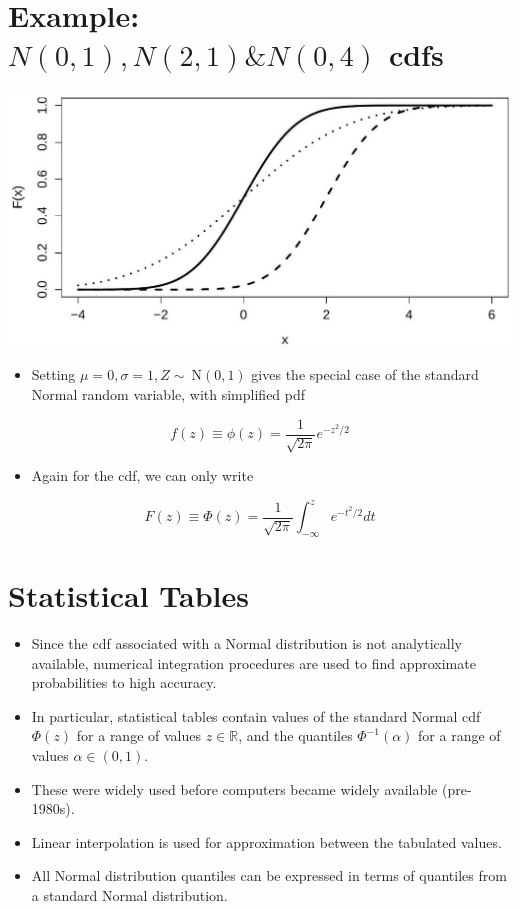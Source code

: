 \documentclass[10pt]{article}
\begin{document}
\section*{Example: $N(0,1), N(2,1) \& N(0,4)$ cdfs}
\begin{center}
\includegraphics[max width=\textwidth]{2025_05_11_1201cfe24e14b364b4ecg-33}
\end{center}

\begin{itemize}
  \item Setting $\mu=0, \sigma=1, Z \sim \mathrm{~N}(0,1)$ gives the special case of the standard Normal random variable, with simplified pdf
\end{itemize}

$$
f(z) \equiv \phi(z)=\frac{1}{\sqrt{2 \pi}} e^{-z^{2} / 2}
$$

\begin{itemize}
  \item Again for the cdf, we can only write
\end{itemize}

$$
F(z) \equiv \Phi(z)=\frac{1}{\sqrt{2 \pi}} \int_{-\infty}^{z} e^{-t^{2} / 2} d t
$$

\section*{Statistical Tables}
\begin{itemize}
  \item Since the cdf associated with a Normal distribution is not analytically available, numerical integration procedures are used to find approximate probabilities to high accuracy.
  \item In particular, statistical tables contain values of the standard Normal cdf $\Phi(z)$ for a range of values $z \in \mathbb{R}$, and the quantiles $\Phi^{-1}(\alpha)$ for a range of values $\alpha \in(0,1)$.
  \item These were widely used before computers became widely available (pre-1980s).
  \item Linear interpolation is used for approximation between the tabulated values.
  \item All Normal distribution quantiles can be expressed in terms of quantiles from a standard Normal distribution.
\end{itemize}
\end{document}
